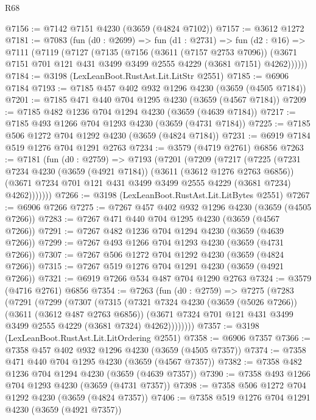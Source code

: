 \begin{lexlean}{R68}
\begin{coremodule}
@7156 := @7142 @7151 @4230 (@3659 (@4824 @7102))
@7157 := @3612 @1272
@7181 := @7083
    (fun (d0 : @2699) =>
    fun (d1 : @2731) =>
    fun (d2 : @16) =>
    @7111
      (@7119
        (@7127
          (@7135
            (@7156
              (@3611 (@7157 @2753 @7096))
              (@3671 @7151 @701 @121 @431 @3499 @3499 @2555 @4229 (@3681 @7151) @4262))))))
@7184 := @3198 (LexLeanBoot.RustAst.Lit.LitStr @2551)
@7185 := @6906 @7184
@7193 := @7185 @457 @402 @932 @1296 @4230 (@3659 (@4505 @7184))
@7201 := @7185 @471 @440 @704 @1295 @4230 (@3659 (@4567 @7184))
@7209 := @7185 @482 @1236 @704 @1294 @4230 (@3659 (@4639 @7184))
@7217 := @7185 @493 @1266 @704 @1293 @4230 (@3659 (@4731 @7184))
@7225 := @7185 @506 @1272 @704 @1292 @4230 (@3659 (@4824 @7184))
@7231 := @6919 @7184 @519 @1276 @704 @1291 @2763
@7234 := @3579 (@4719 @2761) @6856
@7263 := @7181
    (fun (d0 : @2759) =>
    @7193
      (@7201
        (@7209
          (@7217
            (@7225
              (@7231
                @7234
                @4230
                (@3659 (@4921 @7184))
                (@3611 (@3612 @1276 @2763 @6856))
                (@3671 @7234 @701 @121 @431 @3499 @3499 @2555 @4229 (@3681 @7234) @4262)))))))
@7266 := @3198 (LexLeanBoot.RustAst.Lit.LitBytes @2551)
@7267 := @6906 @7266
@7275 := @7267 @457 @402 @932 @1296 @4230 (@3659 (@4505 @7266))
@7283 := @7267 @471 @440 @704 @1295 @4230 (@3659 (@4567 @7266))
@7291 := @7267 @482 @1236 @704 @1294 @4230 (@3659 (@4639 @7266))
@7299 := @7267 @493 @1266 @704 @1293 @4230 (@3659 (@4731 @7266))
@7307 := @7267 @506 @1272 @704 @1292 @4230 (@3659 (@4824 @7266))
@7315 := @7267 @519 @1276 @704 @1291 @4230 (@3659 (@4921 @7266))
@7321 := @6919 @7266 @534 @487 @704 @1290 @2763
@7324 := @3579 (@4716 @2761) @6856
@7354 := @7263
    (fun (d0 : @2759) =>
    @7275
      (@7283
        (@7291
          (@7299
            (@7307
              (@7315
                (@7321
                  @7324
                  @4230
                  (@3659 (@5026 @7266))
                  (@3611 (@3612 @487 @2763 @6856))
                  (@3671 @7324 @701 @121 @431 @3499 @3499 @2555 @4229 (@3681 @7324) @4262))))))))
@7357 := @3198 (LexLeanBoot.RustAst.Lit.LitOrdering @2551)
@7358 := @6906 @7357
@7366 := @7358 @457 @402 @932 @1296 @4230 (@3659 (@4505 @7357))
@7374 := @7358 @471 @440 @704 @1295 @4230 (@3659 (@4567 @7357))
@7382 := @7358 @482 @1236 @704 @1294 @4230 (@3659 (@4639 @7357))
@7390 := @7358 @493 @1266 @704 @1293 @4230 (@3659 (@4731 @7357))
@7398 := @7358 @506 @1272 @704 @1292 @4230 (@3659 (@4824 @7357))
@7406 := @7358 @519 @1276 @704 @1291 @4230 (@3659 (@4921 @7357))

\end{coremodule}
\end{lexlean}
